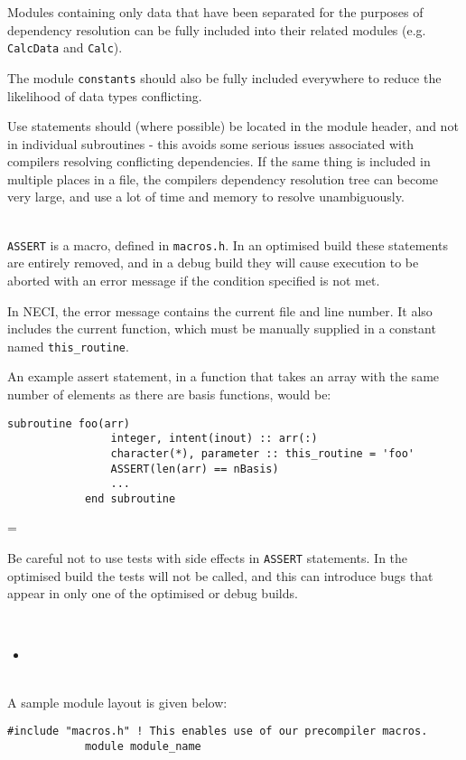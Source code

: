 \documentclass[a4paper,notitlepage]{scrreprt}
\newcommand\headitem[1]{\needspace{1.5\baselineskip}\item[{\boldmath #1 \nopagebreak}] \hfill \\ \nopagebreak}
\let\code\lstinline
\newenvironment{warningbox}
	{\par\begin{mdframed}[%
		linewidth = 2pt, %
	    linecolor = red, %
	    roundcorner = 6pt, %
		backgroundcolor = gray!20
	]\begin{list}{}{\leftmargin=1cm
			           \labelwidth=\leftmargin}\item[\Large\ding{43}]}
	{\end{list}\end{mdframed}\par}
\begin{document}
\begin{description}
		Modules containing only data that have been separated for the purposes
		of dependency resolution can be fully included into their related
		modules (e.g. \code{CalcData} and \code{Calc}).

		The module \code{constants} should also be fully included
		everywhere to reduce the likelihood of data types conflicting.

		Use statements should
		(where possible) be located in the module header, and not in
		individual subroutines - this avoids some serious issues associated
		with compilers resolving conflicting dependencies. If the same thing
		is included in multiple places in a file, the compilers dependency
		resolution tree can become very large, and use a lot of time and
		memory to resolve unambiguously.


	\headitem{{\ttfamily ASSERT} statements}
		\code{ASSERT} is a macro, defined in \code{macros.h}. In
		an optimised build these statements are entirely removed, and in a
		debug build they will cause execution to be aborted with an error
		message if the condition specified is not met.

		In NECI, the error message contains the current file and line number.
		It also includes the current function, which must be manually supplied
		in a constant named \code{this_routine}.

		An example assert statement, in a function that takes an array with
		the same number of elements as there are basis functions, would be:
		\begin{lstlisting}[gobble=8]
			subroutine foo(arr)
				integer, intent(inout) :: arr(:)
				character(*), parameter :: this_routine = 'foo'
				ASSERT(len(arr) == nBasis)
				...
			end subroutine
		\end{lstlisting}

		\begin{warningbox}
			Be careful not to use tests with side effects in \code{ASSERT}
			statements. In the optimised build the tests will not be called,
			and this can introduce bugs that appear in only one of the
			optimised or debug builds.
		\end{warningbox}

	\headitem{Modules and interfaces}
		\begin{itemize}
			\item
		\end{itemize}

	\headitem{Example module layout}
		A sample module layout is given below:
		\begin{lstlisting}[gobble=12]
            #include "macros.h" ! This enables use of our precompiler macros.
            module module_name


\end{lstlisting}
\end{description}
\end{document}
